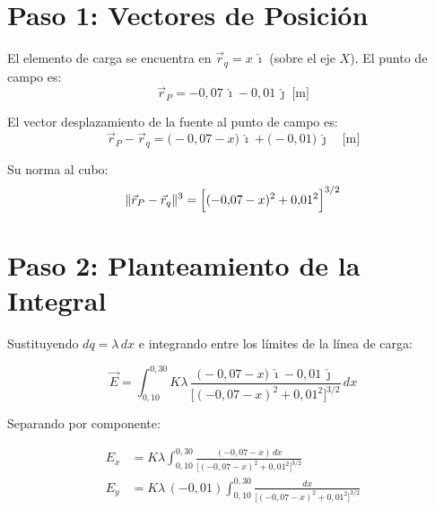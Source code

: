 \documentclass[12pt,letterpaper]{article}
\begin{document}
\section*{Paso 1: Vectores de Posici\'on}

El elemento de carga se encuentra en $\vec{r}_q = x\,\hat{\imath}$ (sobre el eje $X$). El punto de campo es:
\begin{equation*}
    \vec{r}_P = -0{,}07\,\hat{\imath} - 0{,}01\,\hat{\jmath}\;\text{[m]}
\end{equation*}

El vector desplazamiento de la fuente al punto de campo es:
\begin{equation*}
    \vec{r}_P - \vec{r}_q
    = \bigl(-0{,}07 - x\bigr)\,\hat{\imath} + \bigl(-0{,}01\bigr)\,\hat{\jmath}
    \quad\text{[m]}
\end{equation*}

Su norma al cubo:
\begin{equation*}
    \|\vec{r}_P - \vec{r}_q\|^3
    = \Bigl[(-0{,}07 - x)^2 + 0{,}01^2\Bigr]^{3/2}
\end{equation*}

\section*{Paso 2: Planteamiento de la Integral}

Sustituyendo $dq = \lambda\,dx$ e integrando entre los l\'imites de la l\'inea de carga:

\begin{equation*}
    \vec{E}
    = \int_{0{,}10}^{0{,}30}
      K\lambda\,
      \frac{\bigl(-0{,}07 - x\bigr)\,\hat{\imath} - 0{,}01\,\hat{\jmath}}
           {\bigl[(-0{,}07 - x)^2 + 0{,}01^2\bigr]^{3/2}}\,dx
\end{equation*}

Separando por componente:

\begin{align*}
    E_x &= K\lambda
    \int_{0{,}10}^{0{,}30}
    \frac{(-0{,}07 - x)\,dx}{\bigl[(-0{,}07 - x)^2 + 0{,}01^2\bigr]^{3/2}}
    \\[8pt]
    E_y &= K\lambda\,(-0{,}01)
    \int_{0{,}10}^{0{,}30}
    \frac{dx}{\bigl[(-0{,}07 - x)^2 + 0{,}01^2\bigr]^{3/2}}
\end{align*}

\end{document}
